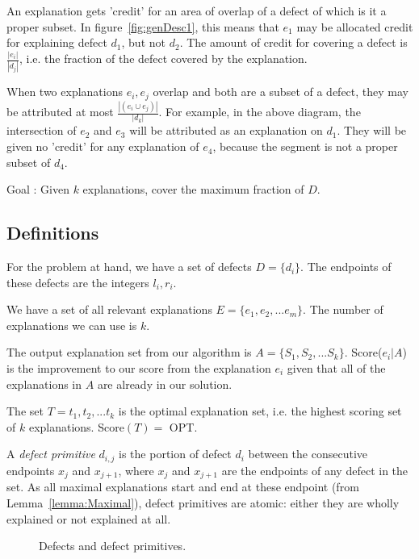 An explanation gets 'credit' for an area of overlap of a defect of which is it a proper subset. In figure~\ref{fig:genDesc1}, this means that $e_1$ may be allocated credit for explaining defect $d_1$, but not $d_2$.  The amount of credit for covering a defect is $\frac{ | e_i |}{|d_j|}$, i.e. the fraction of the defect covered by the explanation.
 
When two explanations $e_i,e_j$ overlap and both are a subset of a defect, they may be attributed at most $\frac{ | (e_i \cup e_j) |}{|d_k|}$. For example, in the above diagram, the intersection of $e_2$ and $e_3$ will be attributed as an explanation on $d_1$. They will be given no 'credit' for any explanation of $e_4$, because the segment is not a proper subset of $d_4.$

Goal : Given $k$ explanations, cover the maximum fraction of $D$.

\subsection{Definitions}

For the problem at hand, we have a set of defects $D = \{d_i\}$.  The endpoints of these defects are the integers $l_i, r_i$.  

We have a set of all relevant explanations $E = \{e_1, e_2, ... e_m\}$.  The number of explanations we can use is $k$.

The output explanation set from our algorithm is $A = \{S_1, S_2, ... S_k\}$.  Score($e_i | A$) is the improvement to our score from the explanation $e_i$ given that all of the explanations in $A$ are already in our solution.

The set $T = t_1, t_2, ... t_k$ is the optimal explanation set, i.e. the highest scoring set of $k$ explanations.  Score$(T) = $ OPT.

A {\it defect primitive} $d_{i,j}$ is the portion of defect $d_i$ between the consecutive endpoints $x_j$ and $x_{j+1}$, where $x_j$ and $x_{j+1}$ are the endpoints of any defect in the set.  As all maximal explanations start and end at these endpoint (from Lemma~\ref{lemma:Maximal}), defect primitives are atomic: either they are wholly explained or not explained at all.

\begin{figure}[H] \centering
  \caption{{\color{green} Defects} and {\color{blue} defect primitives}.}
  \label{fig:defectPrimitives}
\end{figure}

